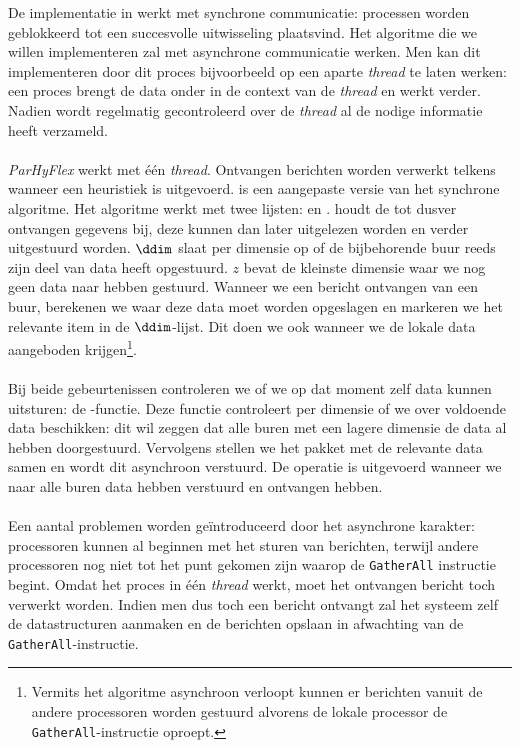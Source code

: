 De implementatie in  werkt met synchrone communicatie: processen worden geblokkeerd tot een succesvolle uitwisseling plaatsvind. Het algoritme die we willen implementeren zal met asynchrone communicatie werken. Men kan dit implementeren door dit proces bijvoorbeeld op een aparte \emph{thread} te laten werken: een proces brengt de data onder in de context van de \emph{thread} en werkt verder. Nadien wordt regelmatig gecontroleerd over de \emph{thread} al de nodige informatie heeft verzameld.


\paragraph{}
\emph{ParHyFlex} werkt met \'e\'en \emph{thread}. Ontvangen berichten worden verwerkt telkens wanneer een heuristiek is uitgevoerd.  is een aangepaste versie van het synchrone algoritme. Het algoritme werkt met twee lijsten: \dres en \ddim. \dres houdt de tot dusver ontvangen gegevens bij, deze kunnen dan later uitgelezen worden en verder uitgestuurd worden. $\ddim$ slaat per dimensie op of de bijbehorende buur reeds zijn deel van data heeft opgestuurd. $z$ bevat de kleinste dimensie waar we nog geen data naar hebben gestuurd. Wanneer we een bericht ontvangen van een buur, berekenen we waar deze data moet worden opgeslagen en markeren we het relevante item in de $\ddim$-lijst. Dit doen we ook wanneer we de lokale data aangeboden krijgen\footnote{Vermits het algoritme asynchroon verloopt kunnen er berichten vanuit de andere processoren worden gestuurd alvorens de lokale processor de \texttt{GatherAll}-instructie oproept.}.

\paragraph{}
Bij beide gebeurtenissen controleren we of we op dat moment zelf data kunnen uitsturen: de \pzedt{}-functie. Deze functie controleert per dimensie of we over voldoende data beschikken: dit wil zeggen dat alle buren met een lagere dimensie de data al hebben doorgestuurd. Vervolgens stellen we het pakket met de relevante data samen en wordt dit asynchroon verstuurd. De operatie is uitgevoerd wanneer we naar alle buren data hebben verstuurd en ontvangen hebben.

\paragraph{}
Een aantal problemen worden ge\"introduceerd door het asynchrone karakter: processoren kunnen al beginnen met het sturen van berichten, terwijl andere processoren nog niet tot het punt gekomen zijn waarop de \texttt{GatherAll} instructie begint. Omdat het proces in \'e\'en \emph{thread} werkt, moet het ontvangen bericht toch verwerkt worden. Indien men dus toch een bericht ontvangt zal het systeem zelf de datastructuren aanmaken en de berichten opslaan in afwachting van de \texttt{GatherAll}-instructie.

